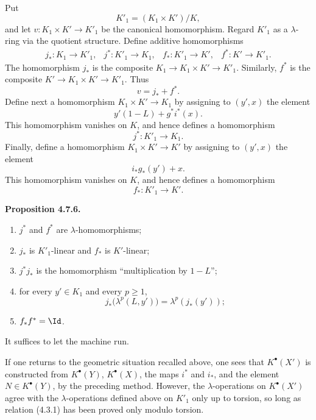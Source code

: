 \documentclass[11pt]{article}
\begin{document}
Put
\[
  K'_1=(K_1\times K')/K,
\]
and let \(v:K_1\times K'\to K'_1\) be the canonical homomorphism. Regard \(K'_1\) as a \(\lambda\)-ring via the quotient structure. Define additive homomorphisms
\[
\begin{array}{llll}
j_*:K_1\to K'_1, & j^*:K'_1\to K_1, &
f_*:K'_1\to K', & f^*:K'\to K'_1 .
\end{array}
\]
The homomorphism \(j_*\) is the composite \(K_1\to K_1\times K'\to K'_1\). Similarly, \(f^*\) is the composite \(K'\to K_1\times K'\to K'_1\). Thus
\[
  v=j_*+f^*.
\]
Define next a homomorphism \(K_1\times K'\to K_1\) by assigning to \((y',x)\) the element
\[
  y'(1-L)+g^*i^*(x).
\]
This homomorphism vanishes on \(K\), and hence defines a homomorphism
\[
  j^*:K'_1\longrightarrow K_1.
\]
Finally, define a homomorphism \(K_1\times K'\to K'\) by assigning to \((y',x)\) the element
\[
  i_*g_*(y')+x.
\]
This homomorphism vanishes on \(K\), and hence defines a homomorphism
\[
  f_*:K'_1\longrightarrow K'.
\]

\textbf{Proposition 4.7.6.}
\begin{enumerate}[label=\roman*)]
\item \(j^*\) and \(f^*\) are \(\lambda\)-homomorphisms;
\item \(j_*\) is \(K'_1\)-linear and \(f_*\) is \(K'\)-linear;
\item \(j^*j_*\) is the homomorphism ``multiplication by \(1-L\)'';
\item for every \(y'\in K_1\) and every \(p\ge1\),
\[
  j_*\bigl(\lambda^p(L,y')\bigr)=\lambda^p(j_*(y'));
\]
\item \(f_*f^*=\Id\).
\end{enumerate}
It suffices to let the machine run.

If one returns to the geometric situation recalled above, one sees that \(K^\bullet(X')\) is constructed from \(K^\bullet(Y)\), \(K^\bullet(X)\), the maps \(i^*\) and \(i_*\), and the element \(N\in K^\bullet(Y)\), by the preceding method. However, the \(\lambda\)-operations on \(K^\bullet(X')\) agree with the \(\lambda\)-operations defined above on \(K'_1\) only up to torsion, so long as relation (4.3.1) has been proved only modulo torsion.
\end{document}
